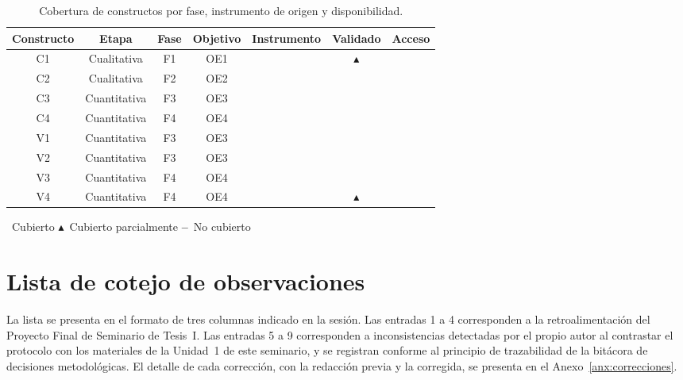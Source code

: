 \documentclass[letter,12pt]{article}
\newcommand{\si}{\textcolor{colorPropuesto}{\textbf{\checkmark}}}
\newcommand{\no}{\textcolor{colorOriginal}{\textbf{--}}}
\newcommand{\parcial}{\textcolor{colorNuevo}{$\blacktriangle$}}
\begin{document}
\begin{table}[H]
\centering
\footnotesize
\caption{Cobertura de constructos por fase, instrumento de origen y disponibilidad.}
\label{tab:cobertura}
\renewcommand{\arraystretch}{1.28}
\begin{tabular}{|c|c|c|c|c|c|c|}
\hline
\rowcolor{bgCotejo}
\textbf{Constructo} & \textbf{Etapa} & \textbf{Fase} & \textbf{Objetivo} & \textbf{Instrumento} & \textbf{Validado} & \textbf{Acceso} \\
\hline
C1 & Cualitativa & F1 & OE1 & \si & \parcial & \si \\
\hline
C2 & Cualitativa & F2 & OE2 & \si & \si & \si \\
\hline
C3 & Cuantitativa & F3 & OE3 & \si & \si & \si \\
\hline
C4 & Cuantitativa & F4 & OE4 & \si & \si & \si \\
\hline
V1 & Cuantitativa & F3 & OE3 & \si & \si & \si \\
\hline
V2 & Cuantitativa & F3 & OE3 & \si & \si & \si \\
\hline
V3 & Cuantitativa & F4 & OE4 & \si & \si & \si \\
\hline
V4 & Cuantitativa & F4 & OE4 & \si & \parcial & \si \\
\hline
\end{tabular}

\vspace{4pt}
{\footnotesize \si~Cubierto \quad \parcial~Cubierto parcialmente \quad \no~No cubierto}
\end{table}

\newpage
\justifying

% 
\section{Lista de cotejo de observaciones}\label{sec:cotejo}

La lista se presenta en el formato de tres columnas indicado en la sesión. Las entradas 1 a 4 corresponden a la retroalimentación del Proyecto Final de Seminario de Tesis~I. Las entradas 5 a 9 corresponden a inconsistencias detectadas por el propio autor al contrastar el protocolo con los materiales de la Unidad~1 de este seminario, y se registran conforme al principio de trazabilidad de la bitácora de decisiones metodológicas. El detalle de cada corrección, con la redacción previa y la corregida, se presenta en el Anexo~\ref{anx:correcciones}.
\end{document}
